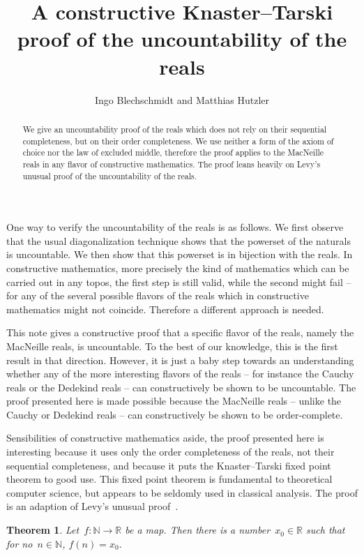 \documentclass[oneside]{amsart}
\title{A constructive Knaster--Tarski proof of the uncountability of the reals}
\author{Ingo Blechschmidt and Matthias Hutzler}
\newcommand{\NN}{\mathbb{N}}
\newcommand{\RR}{\mathbb{R}}
\theoremstyle{definition}
\theoremstyle{plain}
\newtheorem*{thm*}{Theorem}
\theoremstyle{remark}
\begin{document}
\begin{abstract}
  We give an uncountability proof of the reals which does not rely on their
  sequential completeness, but on their order completeness. We use neither a
  form of the axiom of choice nor the law of excluded middle, therefore
  the proof applies to the MacNeille reals in any flavor of constructive
  mathematics. The proof leans heavily on Levy's unusual proof of the
  uncountability of the reals.
\end{abstract}

\maketitle
\thispagestyle{empty}

One way to verify the uncountability of the reals is as follows. We first
observe that the usual diagonalization technique shows that the powerset of the
naturals is uncountable. We then show that this powerset is in bijection with
the reals. In constructive mathematics, more precisely the kind of mathematics
which can be carried out in any topos, the first step is still valid, while the
second might fail -- for any of the several possible flavors of the reals
which in constructive mathematics might not coincide. Therefore a different
approach is needed.

This note gives a constructive proof that a specific flavor of the reals,
namely the MacNeille reals, is uncountable. To the best of our knowledge, this
is the first result in that direction. However, it is just a baby step towards
an understanding whether any of the more interesting flavors of the reals --
for instance the Cauchy reals or the Dedekind reals -- can constructively be
shown to be uncountable. The proof presented here is made possible because the
MacNeille reals -- unlike the Cauchy or Dedekind reals -- can constructively be
shown to be order-complete.

Sensibilities of constructive mathematics aside, the proof presented here is
interesting because it uses only the order completeness of the reals, not their
sequential completeness, and because it puts the Knaster--Tarski fixed point
theorem to good use. This fixed point theorem is fundamental to theoretical
computer science, but appears to be seldomly used in classical analysis.
The proof is an adaption of Levy's unusual proof~\cite{levy}.

\begin{thm*}Let~$f : \NN \to \RR$ be a map. Then there is a number~$x_0 \in \RR$
such that for no~$n \in \NN$, $f(n) = x_0$.\end{thm*}
\end{document}
